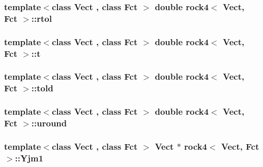 \hypertarget{classrock4_ad3ea883a184e7ffdf537a2040cf5c3a4}{
\subsubsection[{rtol}]{\setlength{\rightskip}{0pt plus 5cm}template$<$class Vect , class Fct $>$ double {\bf rock4}$<$ Vect, Fct $>$\-::rtol\hspace{0.3cm}{\ttfamily [private]}}}\label{classrock4_ad3ea883a184e7ffdf537a2040cf5c3a4}
\hypertarget{classrock4_ac246afd4597caa7119ddab97b5b62608}{
\subsubsection[{t}]{\setlength{\rightskip}{0pt plus 5cm}template$<$class Vect , class Fct $>$ double {\bf rock4}$<$ Vect, Fct $>$\-::t\hspace{0.3cm}{\ttfamily [private]}}}\label{classrock4_ac246afd4597caa7119ddab97b5b62608}
\hypertarget{classrock4_a9409b4c250c0972aa4571dfafb7fcc85}{
\subsubsection[{told}]{\setlength{\rightskip}{0pt plus 5cm}template$<$class Vect , class Fct $>$ double {\bf rock4}$<$ Vect, Fct $>$\-::told\hspace{0.3cm}{\ttfamily [private]}}}\label{classrock4_a9409b4c250c0972aa4571dfafb7fcc85}
\hypertarget{classrock4_a7500f319f271084c4522d7666c1e9d17}{
\subsubsection[{uround}]{\setlength{\rightskip}{0pt plus 5cm}template$<$class Vect , class Fct $>$ double {\bf rock4}$<$ Vect, Fct $>$\-::uround\hspace{0.3cm}{\ttfamily [private]}}}\label{classrock4_a7500f319f271084c4522d7666c1e9d17}
\hypertarget{classrock4_ad6b9fa41b5f8b013aea494c6c8c363e0}{
\subsubsection[{Yjm1}]{\setlength{\rightskip}{0pt plus 5cm}template$<$class Vect , class Fct $>$ Vect $\ast$ {\bf rock4}$<$ Vect, Fct $>$\-::Yjm1\hspace{0.3cm}{\ttfamily [private]}}}\label{classrock4_ad6b9fa41b5f8b013aea494c6c8c363e0}
